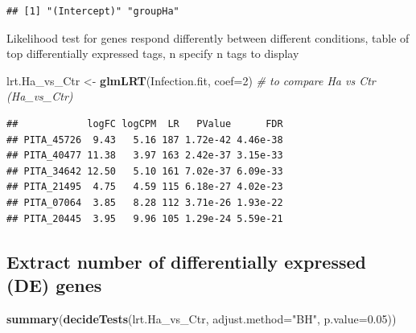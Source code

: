 \documentclass[
]{article}
\newenvironment{Shaded}{\begin{snugshade}}{\end{snugshade}}
\newcommand{\AttributeTok}[1]{\textcolor[rgb]{0.13,0.29,0.53}{#1}}
\newcommand{\CommentTok}[1]{\textcolor[rgb]{0.56,0.35,0.01}{\textit{#1}}}
\newcommand{\DecValTok}[1]{\textcolor[rgb]{0.00,0.00,0.81}{#1}}
\newcommand{\FloatTok}[1]{\textcolor[rgb]{0.00,0.00,0.81}{#1}}
\newcommand{\FunctionTok}[1]{\textcolor[rgb]{0.13,0.29,0.53}{\textbf{#1}}}
\newcommand{\NormalTok}[1]{#1}
\newcommand{\OtherTok}[1]{\textcolor[rgb]{0.56,0.35,0.01}{#1}}
\newcommand{\SpecialCharTok}[1]{\textcolor[rgb]{0.81,0.36,0.00}{\textbf{#1}}}
\newcommand{\StringTok}[1]{\textcolor[rgb]{0.31,0.60,0.02}{#1}}
\begin{document}
\begin{verbatim}
## [1] "(Intercept)" "groupHa"
\end{verbatim}

Likelihood test for genes respond differently between different
conditions, table of top differentially expressed tags, n specify n tags
to display

\begin{Shaded}
\begin{Highlighting}[]
\NormalTok{lrt.Ha\_vs\_Ctr }\OtherTok{\textless{}{-}} \FunctionTok{glmLRT}\NormalTok{(Infection.fit, }\AttributeTok{coef=}\DecValTok{2}\NormalTok{)  }\CommentTok{\# to compare Ha vs Ctr (Ha\_vs\_Ctr)}
\end{Highlighting}
\end{Shaded}

\begin{Shaded}
\end{Shaded}

\begin{verbatim}
##            logFC logCPM  LR   PValue      FDR
## PITA_45726  9.43   5.16 187 1.72e-42 4.46e-38
## PITA_40477 11.38   3.97 163 2.42e-37 3.15e-33
## PITA_34642 12.50   5.10 161 7.02e-37 6.09e-33
## PITA_21495  4.75   4.59 115 6.18e-27 4.02e-23
## PITA_07064  3.85   8.28 112 3.71e-26 1.93e-22
## PITA_20445  3.95   9.96 105 1.29e-24 5.59e-21
\end{verbatim}

\subsection{Extract number of differentially expressed (DE)
genes}\label{extract-number-of-differentially-expressed-de-genes}

\begin{Shaded}
\begin{Highlighting}[]
\FunctionTok{summary}\NormalTok{(}\FunctionTok{decideTests}\NormalTok{(lrt.Ha\_vs\_Ctr, }\AttributeTok{adjust.method=}\StringTok{"BH"}\NormalTok{, }\AttributeTok{p.value=}\FloatTok{0.05}\NormalTok{))}
\end{Highlighting}
\end{Shaded}
\end{document}
